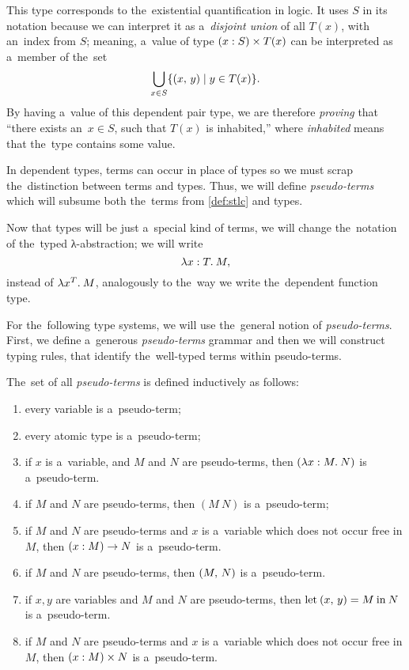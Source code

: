 This type corresponds to the~existential quantification in logic. It uses $S$ in
its notation because we can interpret it as a~\emph{disjoint union} of all
$T(x)$, with an~index from $S$; meaning, a~value of type $(x \overset{}: S) \times
T(x)$ can be interpreted as a~member of the~set
\[
  \bigcup_{x \in S} \{ (x, \, y) \mid y \in T(x) \}.
\]
By having a~value of this dependent pair type, we are therefore \emph{proving}
that ``there exists an~$x \in S$, such that $T(x)$ is inhabited,'' where
\emph{inhabited} means that the~type contains some value.

In dependent types, terms can occur in place of types so we must scrap
the~distinction between terms and types. Thus, we will define
\emph{pseudo-terms} which will subsume both the~terms from \autoref{def:stlc}
and types.

Now that types will be just a~special kind of terms, we will change the~notation
of the~typed λ-abstraction; we will write
\[
  \lambda x \overset{}: T . \: M,
\]
instead of $\lambda x^T . \: M$, analogously to the~way we write the~dependent
function type.


For the~following type systems, we will use the~general notion of
\emph{pseudo-terms}. First, we define a~generous \emph{pseudo-terms} grammar and
then we will construct typing rules, that identify the~well-typed terms within
pseudo-terms.

\begin{definition}\label{def:pseudo-term}
  The~set of all \emph{pseudo-terms} is defined inductively as follows:
  \begin{enumerate} %
    \item every variable is a~pseudo-term;
    \item every atomic type is a~pseudo-term;
    \item if $x$ is a~variable, and $M$ and $N$ are pseudo-terms, then
      $(\lambda x \overset{}: M . \: N)$ is a~pseudo-term.
    \item if $M$ and $N$ are pseudo-terms, then $(M \: N)$ is a~pseudo-term;
    \item if $M$ and $N$ are pseudo-terms and $x$ is a~variable which does not
      occur free in $M$, then $(x : M) \to N$ is a~pseudo-term.
    \item if $M$ and $N$ are pseudo-terms, then $(M, \, N)$ is a~pseudo-term.
    \item if $x, y$ are variables and $M$ and $N$ are pseudo-terms, then
      $\textrm{let} \: (x, \, y) = M \: \textrm{in} \: N$ is a~pseudo-term.
    \item if $M$ and $N$ are pseudo-terms and $x$ is a~variable which does not
      occur free in $M$, then $(x \overset{}: M) \times N$ is a~pseudo-term.
  \end{enumerate}
\end{definition}

